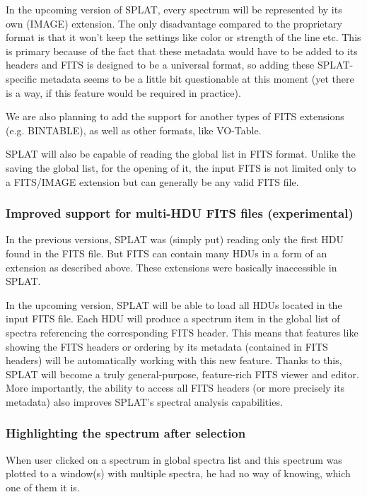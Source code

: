 \documentclass[final,authoryear,5p,times,twocolumn]{elsarticle}
\begin{document}
In the upcoming version of SPLAT, every spectrum will be represented
by its own (IMAGE) extension. The only disadvantage compared to the
proprietary format is that it won't keep the settings like color or
strength of the line etc. This is primary because of the fact that
these metadata would have to be added to its headers and FITS is
designed to be a universal format, so adding these SPLAT-specific
metadata seems to be a little bit questionable at this moment (yet
there is a way, if this feature would be required in practice).

We are also planning to add the support for another types of FITS
extensions (e.g. BINTABLE), as well as other formats, like VO-Table.

SPLAT will also be capable of reading the global list in FITS
format. Unlike the saving the global list, for the opening of it, the
input FITS is not limited only to a FITS/IMAGE extension but can
generally be any valid FITS file.

\subsubsection{Improved support for multi-HDU FITS files (experimental)}

In the previous versions, SPLAT was (simply put) reading only the
first HDU found in the FITS file. But FITS can contain many HDUs in a
form of an extension as described above. These extensions were
basically inaccessible in SPLAT.

In the upcoming version, SPLAT will be able to load all HDUs located
in the input FITS file. Each HDU will produce a spectrum item in the
global list of spectra referencing the corresponding FITS header. This
means that features like showing the FITS headers or ordering by its
metadata (contained in FITS headers) will be automatically working
with this new feature. Thanks to this, SPLAT will become a truly
general-purpose, feature-rich FITS viewer and editor. More
importantly, the ability to access all FITS headers (or more precisely
its metadata) also improves SPLAT's spectral analysis capabilities.

\subsubsection{Highlighting the spectrum after selection}

When user clicked on a spectrum in global spectra list and this
spectrum was plotted to a window(s) with multiple spectra, he had no
way of knowing, which one of them it is.
\end{document}
